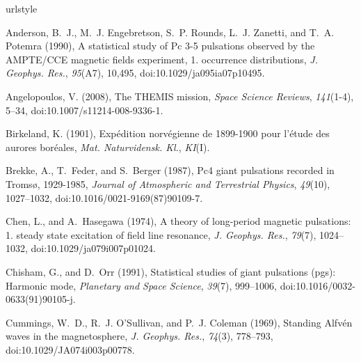 \documentclass[draft,linenumbers]{agujournal}
\begin{document}
\begin{thebibliography}{50}
\providecommand{\natexlab}[1]{#1}
\expandafter\ifx\csname urlstyle\endcsname\relax
  \providecommand{\doi}[1]{doi:\discretionary{}{}{}#1}\else
  \providecommand{\doi}{doi:\discretionary{}{}{}\begingroup
  \urlstyle{rm}\Url}\fi

Anderson, B.~J., M.~J. Engebretson, S.~P. Rounds, L.~J. Zanetti, and T.~A.
  Potemra (1990), A statistical study of {Pc} 3-5 pulsations observed by the
  {AMPTE}/{CCE} magnetic fields experiment, 1. occurrence distributions,
  \textit{J. Geophys. Res.}, \textit{95}(A7), 10,495,
  \doi{10.1029/ja095ia07p10495}.

Angelopoulos, V. (2008), The {THEMIS} mission, \textit{Space Science Reviews},
  \textit{141}(1-4), 5--34, \doi{10.1007/s11214-008-9336-1}.

Birkeland, K. (1901), Exp{\'e}dition norv{\'e}gienne de 1899-1900 pour
  l'{\'e}tude des aurores bor{\'e}ales, \textit{Mat. Naturvidensk. Kl.},
  \textit{KI}(I).

Brekke, A., T.~Feder, and S.~Berger (1987), Pc4 giant pulsations recorded in
  {Troms{\o}}, 1929-1985, \textit{Journal of Atmospheric and Terrestrial
  Physics}, \textit{49}(10), 1027--1032, \doi{10.1016/0021-9169(87)90109-7}.

Chen, L., and A.~Hasegawa (1974), A theory of long-period magnetic pulsations:
  1. steady state excitation of field line resonance, \textit{J. Geophys.
  Res.}, \textit{79}(7), 1024--1032, \doi{10.1029/ja079i007p01024}.

Chisham, G., and D.~Orr (1991), Statistical studies of giant pulsations (pgs):
  Harmonic mode, \textit{Planetary and Space Science}, \textit{39}(7),
  999--1006, \doi{10.1016/0032-0633(91)90105-j}.

Cummings, W.~D., R.~J. O'Sullivan, and P.~J. Coleman (1969), Standing
  {Alfv{\'e}n} waves in the magnetosphere, \textit{J. Geophys. Res.},
  \textit{74}(3), 778--793, \doi{10.1029/JA074i003p00778}.


\end{thebibliography}
\end{document}
